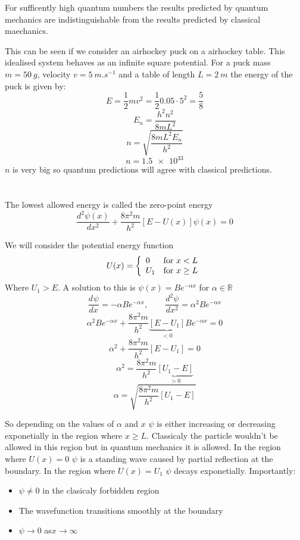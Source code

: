 \documentclass{article}
\newcommand{\dv}[3][]{\frac{d^{#1}{#2}}{d{#3}^{#1}}}
\newcommand{\bb}[1]{\mathbb{#1}}
\begin{document}
\begin{displayquote}
For sufficently high quantum numbers the results predicted by quantum mechanics are indistinguishable from the results predicted by classical maechanics.
\end{displayquote}

This can be seen if we consider an airhockey puck on a airhockey table. This idealised system behaves as an infinite square potential. For a puck mass \(m=\SI{50}{g}\), velocity \(v=\SI{5}{m.s^{-1}}\) and a table of length \(L=\SI{2}{m}\) the energy of the puck is given by:
\[E=\frac 12mv^2=\frac 120.05\cdot 5^2=\frac 58\]
\[E_n=\frac{h^2n^2}{8mL^2}\]
\[n=\sqrt{\frac{8mL^2E_n}{h^2}}\]
\[n=\num{1.5e33}\]
\(n\) is very big so quantum predictions will agree with classical predictions.

\section{}

The lowest allowed energy is called the zero-point energy
\[\dv[2]{\psi(x)}{x} + \frac{8\pi^2m}{h^2}[E-U(x)]\psi(x)=0\]

We will consider the potential energy function
\[U(x)=\left\{
\begin{array}{l l}
0 & \text{for } x<L\\
U_1 & \text{for } x\ge L
\end{array}
\right.\]
Where \(U_1>E\). A solution to this is \(\psi(x)=Be^{-\alpha x}\) for \(\alpha\in\bb R\)
\[\dv{\psi}{x}=-\alpha Be^{-\alpha x},\qquad \dv[2]{\psi}{x}=\alpha^2Be^{-\alpha x}\]
\[\alpha^2 B e^{-\alpha x}+\frac{8\pi^2m}{h^2}\underbrace{[E-U_1]}_{<0}Be^{-\alpha x}=0\]
\[\alpha^2 +\frac{8\pi^2m}{h^2}[E-U_1]=0\]
\[\alpha^2=\frac{8\pi^2m}{h^2}\underbrace{[U_1-E]}_{>0}\]
\[\alpha = \sqrt{\frac{8\pi^2m}{h^2}[U_1-E]}\]

So depending on the values of \(\alpha\) and \(x\) \(\psi\) is either increasing or decreasing exponetially in the region where \(x\ge L\). Classicaly the particle wouldn't be allowed in this region but in quantum mechanics it is allowed. In the region where \(U(x) = 0\) \(\psi\) is a standing wave caused by partial reflection at the boundary. In the region where \(U(x) = U_1\) \(\psi\) decays exponetially. Importantly:
\begin{itemize}
\item \(\psi\ne 0\) in the clasicaly forbidden region
\item The wavefunction transitions smoothly at the boundary
\item \(\psi\to0\) as\(x\to\infty\)
\end{itemize}
\end{document}
